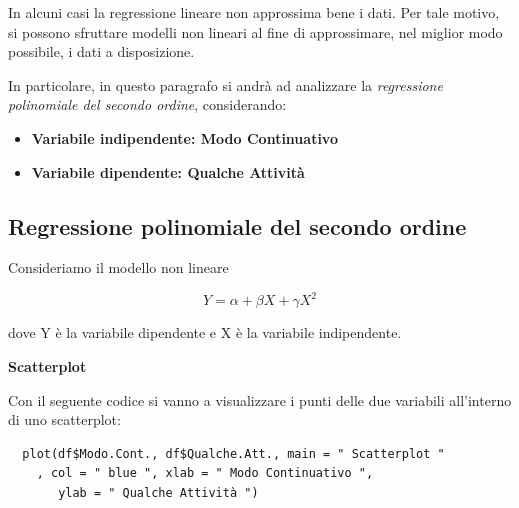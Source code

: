 In alcuni casi la regressione lineare non approssima bene i dati. Per tale motivo, si possono sfruttare modelli non lineari al fine di approssimare, nel miglior modo possibile, i dati a disposizione.

In particolare, in questo paragrafo si andrà ad analizzare la \textit{regressione polinomiale del secondo ordine}, considerando:

\begin{itemize}
    \item \textbf{Variabile indipendente: Modo Continuativo}
    \item \textbf{Variabile dipendente: Qualche Attività}
\end{itemize}

\subsection{Regressione polinomiale del secondo ordine}\label{cap4.4.1}

Consideriamo il modello non lineare

\[Y = \alpha + \beta X + \gamma X^2\]

dove Y è la variabile dipendente e X è la variabile indipendente.

\vspace{5mm}
\noindent \textbf{Scatterplot}

Con il seguente codice si vanno a visualizzare i punti delle due variabili all'interno di uno scatterplot: 

\vspace{5mm}
\begin{lstlisting}
  plot(df$Modo.Cont., df$Qualche.Att., main = " Scatterplot "
    , col = " blue ", xlab = " Modo Continuativo ",
       ylab = " Qualche Attività ")
\end{lstlisting}

